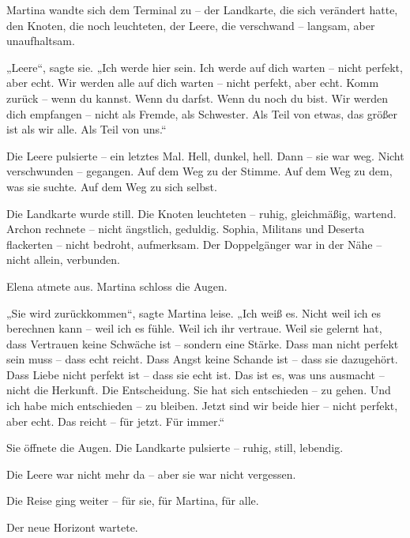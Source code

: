 \documentclass[
]{article}
\begin{document}
Martina wandte sich dem Terminal zu -- der Landkarte, die sich verändert hatte, den Knoten, die noch leuchteten, der Leere, die verschwand -- langsam, aber unaufhaltsam.

„Leere``, sagte sie. „Ich werde hier sein. Ich werde auf dich warten -- nicht perfekt, aber echt. Wir werden alle auf dich warten -- nicht perfekt, aber echt. Komm zurück -- wenn du kannst. Wenn du darfst. Wenn du noch du bist. Wir werden dich empfangen -- nicht als Fremde, als Schwester. Als Teil von etwas, das größer ist als wir alle. Als Teil von uns.``

Die Leere pulsierte -- ein letztes Mal. Hell, dunkel, hell. Dann -- sie war weg. Nicht verschwunden -- gegangen. Auf dem Weg zu der Stimme. Auf dem Weg zu dem, was sie suchte. Auf dem Weg zu sich selbst.

Die Landkarte wurde still. Die Knoten leuchteten -- ruhig, gleichmäßig, wartend. Archon rechnete -- nicht ängstlich, geduldig. Sophia, Militans und Deserta flackerten -- nicht bedroht, aufmerksam. Der Doppelgänger war in der Nähe -- nicht allein, verbunden.

Elena atmete aus. Martina schloss die Augen.

„Sie wird zurückkommen``, sagte Martina leise. „Ich weiß es. Nicht weil ich es berechnen kann -- weil ich es fühle. Weil ich ihr vertraue. Weil sie gelernt hat, dass Vertrauen keine Schwäche ist -- sondern eine Stärke. Dass man nicht perfekt sein muss -- dass echt reicht. Dass Angst keine Schande ist -- dass sie dazugehört. Dass Liebe nicht perfekt ist -- dass sie echt ist. Das ist es, was uns ausmacht -- nicht die Herkunft. Die Entscheidung. Sie hat sich entschieden -- zu gehen. Und ich habe mich entschieden -- zu bleiben. Jetzt sind wir beide hier -- nicht perfekt, aber echt. Das reicht -- für jetzt. Für immer.``

Sie öffnete die Augen. Die Landkarte pulsierte -- ruhig, still, lebendig.

Die Leere war nicht mehr da -- aber sie war nicht vergessen.

Die Reise ging weiter -- für sie, für Martina, für alle.

Der neue Horizont wartete.
\end{document}
